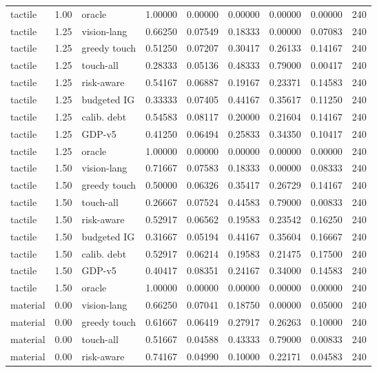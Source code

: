 \documentclass{article}
\begin{document}
\begin{center}
\begin{longtable}{lllllllll}
tactile & 1.00 & oracle & 1.00000 & 0.00000 & 0.00000 & 0.00000 & 0.00000 & 240 \\
tactile & 1.25 & vision-lang & 0.66250 & 0.07549 & 0.18333 & 0.00000 & 0.07083 & 240 \\
tactile & 1.25 & greedy touch & 0.51250 & 0.07207 & 0.30417 & 0.26133 & 0.14167 & 240 \\
tactile & 1.25 & touch-all & 0.28333 & 0.05136 & 0.48333 & 0.79000 & 0.00417 & 240 \\
tactile & 1.25 & risk-aware & 0.54167 & 0.06887 & 0.19167 & 0.23371 & 0.14583 & 240 \\
tactile & 1.25 & budgeted IG & 0.33333 & 0.07405 & 0.44167 & 0.35617 & 0.11250 & 240 \\
tactile & 1.25 & calib. debt & 0.54583 & 0.08117 & 0.20000 & 0.21604 & 0.14167 & 240 \\
tactile & 1.25 & GDP-v5 & 0.41250 & 0.06494 & 0.25833 & 0.34350 & 0.10417 & 240 \\
tactile & 1.25 & oracle & 1.00000 & 0.00000 & 0.00000 & 0.00000 & 0.00000 & 240 \\
tactile & 1.50 & vision-lang & 0.71667 & 0.07583 & 0.18333 & 0.00000 & 0.08333 & 240 \\
tactile & 1.50 & greedy touch & 0.50000 & 0.06326 & 0.35417 & 0.26729 & 0.14167 & 240 \\
tactile & 1.50 & touch-all & 0.26667 & 0.07524 & 0.44583 & 0.79000 & 0.00833 & 240 \\
tactile & 1.50 & risk-aware & 0.52917 & 0.06562 & 0.19583 & 0.23542 & 0.16250 & 240 \\
tactile & 1.50 & budgeted IG & 0.31667 & 0.05194 & 0.44167 & 0.35604 & 0.16667 & 240 \\
tactile & 1.50 & calib. debt & 0.52917 & 0.06214 & 0.19583 & 0.21475 & 0.17500 & 240 \\
tactile & 1.50 & GDP-v5 & 0.40417 & 0.08351 & 0.24167 & 0.34000 & 0.14583 & 240 \\
tactile & 1.50 & oracle & 1.00000 & 0.00000 & 0.00000 & 0.00000 & 0.00000 & 240 \\
material & 0.00 & vision-lang & 0.66250 & 0.07041 & 0.18750 & 0.00000 & 0.05000 & 240 \\
material & 0.00 & greedy touch & 0.61667 & 0.06419 & 0.27917 & 0.26263 & 0.10000 & 240 \\
material & 0.00 & touch-all & 0.51667 & 0.04588 & 0.43333 & 0.79000 & 0.00833 & 240 \\
material & 0.00 & risk-aware & 0.74167 & 0.04990 & 0.10000 & 0.22171 & 0.04583 & 240 \\

\end{longtable}
\end{center}
\end{document}

